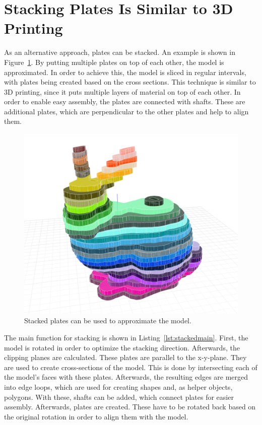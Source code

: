 \documentclass[../ClassicThesis.tex]{subfiles}
\begin{document}
\section{Stacking Plates Is Similar to 3D Printing}\label{sec:stackedplates}

As an alternative approach, plates can be stacked. An example is shown in Figure~\ref{fig:stackedbunny}. By putting multiple plates on top of each other, the model is approximated. In order to achieve this, the model is sliced in regular intervals, with plates being created based on the cross sections. This technique is similar to 3D printing, since it puts multiple layers of material on top of each other. In order to enable easy assembly, the plates are connected with shafts. These are additional plates, which are perpendicular to the other plates and help to align them.

\begin{figure}
    \centering
    \includegraphics[width=.5\textwidth]{Images/bunny_1.png}
    \caption{Stacked plates can be used to approximate the model.}
    \label{fig:stackedbunny}
\end{figure}

The main function for stacking is shown in Listing~\ref{lst:stackedmain}. First, the model is rotated in order to optimize the stacking direction. Afterwards, the clipping planes are calculated. These plates are parallel to the x-y-plane. They are used to create cross-sections of the model. This is done by intersecting each of the model's faces with these plates. Afterwards, the resulting edges are merged into edge loops, which are used for creating shapes and, as helper objects, polygons. With these, shafts can be added, which connect plates for easier assembly. Afterwards, plates are created. These have to be rotated back based on the original rotation in order to align them with the model. 
\end{document}
